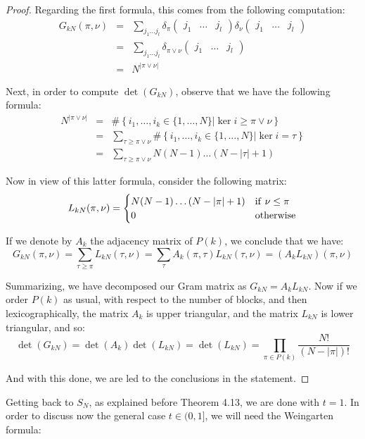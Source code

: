 \documentclass[12pt]{amsbook}
\begin{document}
\begin{proof}
Regarding the first formula, this comes from the following computation:
\begin{eqnarray*}
G_{kN}(\pi,\nu)
&=&\sum_{j_1\ldots j_l}
\delta_\pi\begin{pmatrix}j_1&\ldots& j_l\end{pmatrix}
\delta_\nu\begin{pmatrix}j_1&\ldots& j_l\end{pmatrix}\\
&=&\sum_{j_1\ldots j_l}
\delta_{\pi\vee\nu}\begin{pmatrix}j_1&\ldots& j_l\end{pmatrix}\\
&=&N^{|\pi\vee\nu|}
\end{eqnarray*}

Next, in order to compute $\det(G_{kN})$, observe that we have the following formula:
\begin{eqnarray*}
N^{|\pi\vee\nu|}
&=&\#\left\{i_1,\ldots,i_k\in\{1,\ldots,N\}\Big|\ker i\geq\pi\vee\nu\right\}\\
&=&\sum_{\tau\geq\pi\vee\nu}\#\left\{i_1,\ldots,i_k\in\{1,\ldots,N\}\Big|\ker i=\tau\right\}\\
&=&\sum_{\tau\geq\pi\vee\nu}N(N-1)\ldots(N-|\tau|+1)
\end{eqnarray*}

Now in view of this latter formula, consider the following matrix:
$$L_{kN}(\pi,\nu)=
\begin{cases}
N(N-1)\ldots(N-|\pi|+1)&{\rm if}\ \nu\leq\pi\\
0&{\rm otherwise}
\end{cases}$$

If we denote by $A_k$ the adjacency matrix of $P(k)$, we conclude that we have:
$$G_{kN}(\pi,\nu)
=\sum_{\tau\geq\pi}L_{kN}(\tau,\nu)
=\sum_\tau A_k(\pi,\tau)L_{kN}(\tau,\nu)
=(A_kL_{kN})(\pi,\nu)$$

Summarizing, we have decomposed our Gram matrix as $G_{kN}=A_kL_{kN}$. Now if we order $P(k)$ as usual, with respect to the number of blocks, and then lexicographically, the matrix $A_k$ is upper triangular, and the matrix $L_{kN}$ is lower triangular, and so:
$$\det(G_{kN})
=\det(A_k)\det(L_{kN})
=\det(L_{kN})
=\prod_{\pi\in P(k)}\frac{N!}{(N-|\pi|)!}$$

And with this done, we are led to the conclusions in the statement. 
\end{proof}

Getting back to $S_N$, as explained before Theorem 4.13, we are done with $t=1$. In order to discuss now the general case $t\in(0,1]$, we will need the Weingarten formula:
\end{document}
